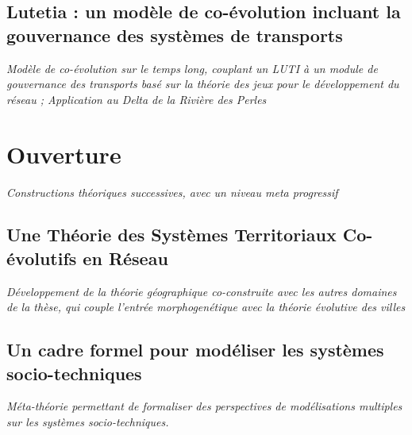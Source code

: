 \subsection{Lutetia : un modèle de co-évolution incluant la gouvernance des systèmes de transports}


\textit{Modèle de co-évolution sur le temps long, couplant un LUTI à un module de gouvernance des transports basé sur la théorie des jeux pour le développement du réseau ; Application au Delta de la Rivière des Perles}







\section{Ouverture}




\textit{Constructions théoriques successives, avec un niveau meta progressif}

\subsection{Une Théorie des Systèmes Territoriaux Co-évolutifs en Réseau}

\textit{Développement de la théorie géographique co-construite avec les autres domaines de la thèse, qui couple l'entrée morphogenétique avec la théorie évolutive des villes}


\subsection{Un cadre formel pour modéliser les systèmes socio-techniques}

\textit{Méta-théorie permettant de formaliser des perspectives de modélisations multiples sur les systèmes socio-techniques.}




